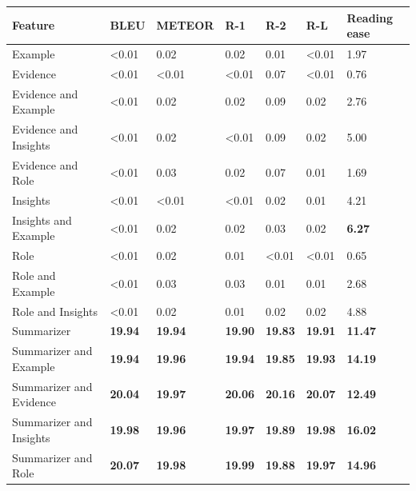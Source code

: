 \begin{tabular}{|l|l|l|l|l|l|l|}
\hline
\textbf{Feature} & BLEU & METEOR & R-1 & R-2 & R-L & Reading ease \\
 \hline
 Example & \textless{}0.01 & 0.02 & 0.02 & 0.01 & \textless{}0.01 & 1.97 \\
 \hline
 Evidence & \textless{}0.01 & \textless{}0.01 & \textless{}0.01 & 0.07 & \textless{}0.01 & 0.76 \\
 \hline
 Evidence and Example & \textless{}0.01 & 0.02 & 0.02 & 0.09 & 0.02 & 2.76 \\
 \hline
 Evidence and Insights & \textless{}0.01 & 0.02 & \textless{}0.01 & 0.09 & 0.02 & 5.00 \\
 \hline
 Evidence and Role & \textless{}0.01 & 0.03 & 0.02 & 0.07 & 0.01 & 1.69 \\
 \hline
 Insights & \textless{}0.01 & \textless{}0.01 & \textless{}0.01 & 0.02 & 0.01 & 4.21 \\
 \hline
 Insights and Example & \textless{}0.01 & 0.02 & 0.02 & 0.03 & 0.02 & \textbf{6.27} \\
 \hline
 Role & \textless{}0.01 & 0.02 & 0.01 & \textless{}0.01 & \textless{}0.01 & 0.65 \\
 \hline
 Role and Example & \textless{}0.01 & 0.03 & 0.03 & 0.01 & 0.01 & 2.68 \\
 \hline
 Role and Insights & \textless{}0.01 & 0.02 & 0.01 & 0.02 & 0.02 & 4.88 \\
 \hline
 Summarizer & \textbf{19.94} & \textbf{19.94} & \textbf{19.90} & \textbf{19.83} & \textbf{19.91} & \textbf{11.47} \\
 \hline
 Summarizer and Example & \textbf{19.94} & \textbf{19.96} & \textbf{19.94} & \textbf{19.85} & \textbf{19.93} & \textbf{14.19} \\
 \hline
 Summarizer and Evidence & \textbf{20.04} & \textbf{19.97} & \textbf{20.06} & \textbf{20.16} & \textbf{20.07} & \textbf{12.49} \\
 \hline
 Summarizer and Insights & \textbf{19.98} & \textbf{19.96} & \textbf{19.97} & \textbf{19.89} & \textbf{19.98} & \textbf{16.02} \\
 \hline
 Summarizer and Role & \textbf{20.07} & \textbf{19.98} & \textbf{19.99} & \textbf{19.88} & \textbf{19.97} & \textbf{14.96} \\
\hline
\end{tabular}
